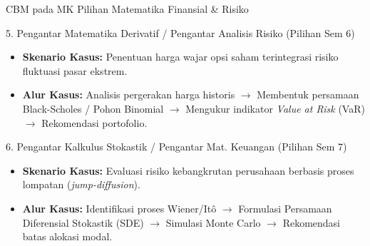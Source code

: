 \documentclass[aspectratio=169]{beamer} %
\begin{document}
\begin{frame}{CBM pada MK Pilihan Matematika Finansial \& Risiko}
    \begin{block}{5. Pengantar Matematika Derivatif / Pengantar Analisis Risiko (Pilihan Sem 6)}
        \begin{itemize}
            \item \textbf{Skenario Kasus:} Penentuan harga wajar opsi saham terintegrasi risiko fluktuasi pasar ekstrem.
            \item \textbf{Alur Kasus:} Analisis pergerakan harga historis $\rightarrow$ Membentuk persamaan Black-Scholes / Pohon Binomial $\rightarrow$ Mengukur indikator \textit{Value at Risk} (VaR) $\rightarrow$ Rekomendasi portofolio.
        \end{itemize}
    \end{block}

    \begin{block}{6. Pengantar Kalkulus Stokastik / Pengantar Mat. Keuangan (Pilihan Sem 7)}
        \begin{itemize}
            \item \textbf{Skenario Kasus:} Evaluasi risiko kebangkrutan perusahaan berbasis proses lompatan (\textit{jump-diffusion}).
            \item \textbf{Alur Kasus:} Identifikasi proses Wiener/Itô $\rightarrow$ Formulasi Persamaan Diferensial Stokastik (SDE) $\rightarrow$ Simulasi Monte Carlo $\rightarrow$ Rekomendasi batas alokasi modal.
        \end{itemize}
    \end{block}
\end{frame}
\end{document}
